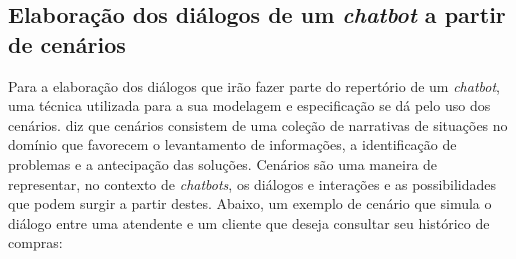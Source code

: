 \subsection{Elaboração dos diálogos de um \textit{chatbot} a partir de cenários}

Para a elaboração dos diálogos que irão fazer parte do repertório de um \textit{chatbot}, uma técnica utilizada para a sua modelagem e especificação se dá pelo uso dos cenários.
 diz que cenários consistem de uma coleção de narrativas de situações no domínio que favorecem o levantamento de informações, a identificação de problemas e a antecipação das soluções.
Cenários são uma maneira de representar, no contexto de \textit{chatbots}, os diálogos e interações e as possibilidades que podem surgir a partir destes. Abaixo, um exemplo de cenário que simula o diálogo entre uma atendente e um cliente que deseja consultar seu histórico de compras:



